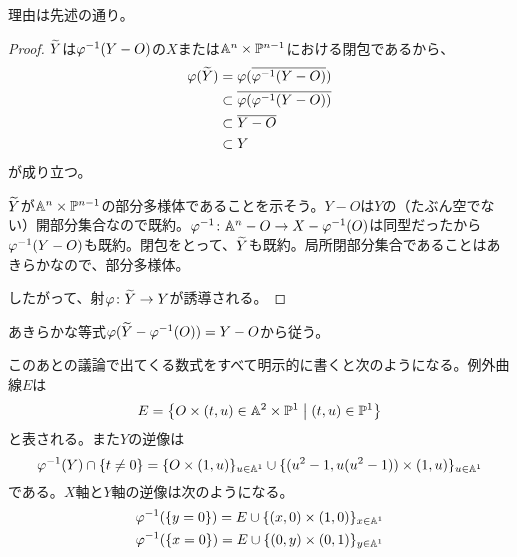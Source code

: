 

\begin{rem}
  理由は先述の通り。
\end{rem}





\begin{proof}
  $\widetilde{Y}$は${\varphi}^{-1}(Y - O)$の$X$または${\mathbb A}^n \times {\mathbb P}^{n-1}$における閉包であるから、
  \begin{align*}
    {\varphi}(\widetilde{Y}) &= {\varphi}(\overline{{\varphi}^{-1}(Y-O)}) \\
    &\subset \overline{{\varphi}({\varphi}^{-1}(Y-O))} \\
    &\subset \overline{Y-O} \\
    &\subset Y
  \end{align*}
  が成り立つ。

  $\widetilde{Y}$が${\mathbb A}^n \times {\mathbb P}^{n-1}$の部分多様体であることを示そう。$Y-O$は$Y$の（たぶん空でない）開部分集合なので既約。${\varphi}^{-1} \colon {\mathbb A}^n-O \to X - {\varphi}^{-1}(O)$は同型だったから${\varphi}^{-1}(Y - O)$も既約。閉包をとって、$\widetilde{Y}$も既約。局所閉部分集合であることはあきらかなので、部分多様体。

  したがって、射${\varphi} \colon \widetilde{Y} \to Y$が誘導される。
\end{proof}



\begin{rem}
  あきらかな等式${\varphi}(\widetilde{Y} -{\varphi}^{-1}(O)) = Y - O$から従う。
\end{rem}


\begin{rem}
  このあとの議論で出てくる数式をすべて明示的に書くと次のようになる。例外曲線$E$は
  \[
  E = \left\{ O \times (t,u) \in {\mathbb A}^2 \times {\mathbb P}^1 \mathrel{} \middle| \mathrel{} (t,u) \in {\mathbb P}^1 \right\}
  \]
  と表される。また$Y$の逆像は
  \[
  {\varphi}^{-1}(Y) \cap \{ t \neq 0 \} = \{ O \times (1,u) \}_{u \in {\mathbb A}^1} \cup \{(u^2-1,u(u^2-1)) \times (1,u) \}_{u \in {\mathbb A}^1}
  \]
  である。$X$軸と$Y$軸の逆像は次のようになる。
  \begin{gather*}
{\varphi}^{-1}(\{ y=0 \}) =E \cup \{(x,0) \times (1,0)\}_{x \in {\mathbb A}^1} \\
  {\varphi}^{-1}(\{ x=0 \}) =E \cup \{(0,y) \times (0,1)\}_{y \in {\mathbb A}^1}
  \end{gather*}
\end{rem}

